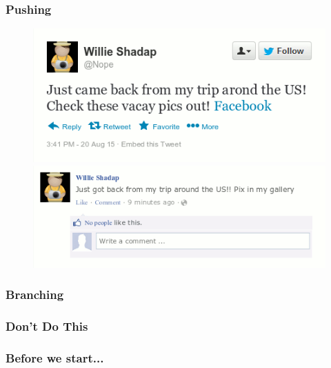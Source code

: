 \documentclass[glossy]{beamer}
\begin{document}
\begin{frame}[fragile=singleslide]
  \frametitle{Pushing}

  \begin{figure}
    \centering
    \includegraphics[width=0.8\columnwidth]{twitter-push}

    \includegraphics[width=0.8\columnwidth]{facebook-push}
  \end{figure}
\end{frame}

\begin{frame}[fragile=singleslide]
  \frametitle{Branching}

  \begin{figure}
    \centering
    
  \end{figure}
\end{frame}

\begin{frame}[fragile=singleslide]
  \frametitle{Don't Do This}

  \begin{figure}
    \centering
    
  \end{figure}
\end{frame}

\begin{frame}[fragile=singleslide]
  \frametitle{Before we start...}

\end{frame}
\end{document}
